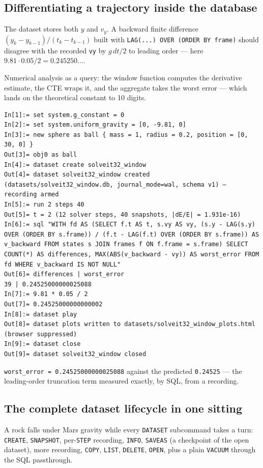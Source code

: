 \documentclass[11pt]{article}
\newcommand{\kw}[1]{\texttt{\uppercase{#1}}}
\newcommand{\code}[1]{\texttt{#1}}
\begin{document}
\subsection{Differentiating a trajectory inside the database}

The dataset stores both $y$ and $v_y$. A backward finite difference
$(y_k - y_{k-1})/(t_k - t_{k-1})$ built with \code{LAG(...) OVER
(ORDER BY frame)} should disagree with the recorded \code{vy} by
$g\,dt/2$ to leading order --- here
$9.81 \cdot 0.05 / 2 = 0.245250\dots$.

Numerical analysis as a query: the window function computes the
derivative estimate, the CTE wraps it, and the aggregate takes the
worst error --- which lands on the theoretical constant to 10
digits.

\begin{lstlisting}
In[1]:= set system.g_constant = 0
In[2]:= set system.uniform_gravity = [0, -9.81, 0]
In[3]:= new sphere as ball { mass = 1, radius = 0.2, position = [0, 30, 0] }
Out[3]= obj0 as ball
In[4]:= dataset create solveit32_window
Out[4]= dataset solveit32_window created (datasets/solveit32_window.db, journal_mode=wal, schema v1) — recording armed
In[5]:= run 2 steps 40
Out[5]= t = 2 (12 solver steps, 40 snapshots, |dE/E| = 1.931e-16)
In[6]:= sql "WITH fd AS (SELECT f.t AS t, s.vy AS vy, (s.y - LAG(s.y) OVER (ORDER BY s.frame)) / (f.t - LAG(f.t) OVER (ORDER BY s.frame)) AS v_backward FROM states s JOIN frames f ON f.frame = s.frame) SELECT COUNT(*) AS differences, MAX(ABS(v_backward - vy)) AS worst_error FROM fd WHERE v_backward IS NOT NULL"
Out[6]= differences | worst_error
39 | 0.24525000000025088
In[7]:= 9.81 * 0.05 / 2
Out[7]= 0.24525000000000002
In[8]:= dataset play
Out[8]= dataset plots written to datasets/solveit32_window_plots.html (browser suppressed)
In[9]:= dataset close
Out[9]= dataset solveit32_window closed
\end{lstlisting}

\code{worst\_error = 0.24525000000025088} against the predicted
\code{0.24525} --- the leading-order truncation term measured exactly,
by SQL, from a recording.

\subsection{The complete dataset lifecycle in one sitting}

A rock falls under Mars gravity while every \kw{dataset} subcommand
takes a turn: \kw{create}, \kw{snapshot}, per-\kw{step} recording,
\kw{info}, \kw{saveas} (a checkpoint of the open dataset), more
recording, \kw{copy}, \kw{list}, \kw{delete}, \kw{open}, plus a plain
\code{VACUUM} through the SQL passthrough.
\end{document}
